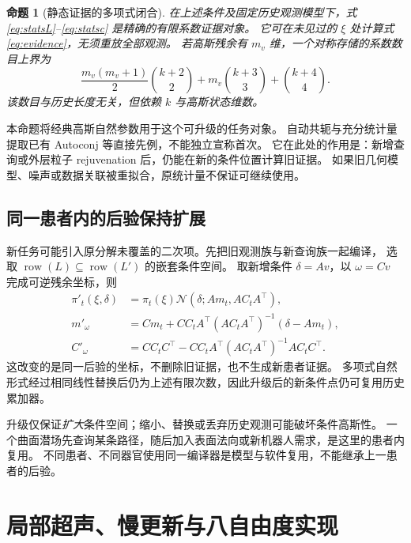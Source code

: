 \documentclass[11pt,a4paper]{article}
\numberwithin{equation}{section}
\newtheorem{proposition}[theorem]{命题}
\theoremstyle{definition}
\newcommand{\N}{\mathcal N}
\DeclareMathOperator{\row}{row}
\begin{document}
\begin{proposition}[静态证据的多项式闭合]
\label{prop:stats}
在上述条件及固定历史观测模型下，式\eqref{eq:statsL}--\eqref{eq:statsc} 是精确的有限系数证据对象。
它可在未见过的 \(\xi\) 处计算式\eqref{eq:evidence}，无须重放全部观测。
若高斯残余有 \(m_v\) 维，一个对称存储的系数数目上界为
\begin{equation}
 \frac{m_v(m_v+1)}2\binom{k+2}{2}
   +m_v\binom{k+3}{3}+\binom{k+4}{4}.
 \label{eq:storage}
\end{equation}
该数目与历史长度无关，但依赖 \(k\) 与高斯状态维数。
\end{proposition}

本命题将经典高斯自然参数用于这个可升级的任务对象。
自动共轭与充分统计量提取已有 Autoconj 等直接先例\cite{autoconj2018}，不能独立宣称首次。
它在此处的作用是：新增查询或外层粒子 rejuvenation 后，仍能在新的条件位置计算旧证据。
如果旧几何模型、噪声或数据关联被重拟合，原统计量不保证可继续使用。

\subsection{同一患者内的后验保持扩展}
新任务可能引入原分解未覆盖的二次项。先把旧观测族与新查询族一起编译，
选取 \(\row(L)\subseteq\row(L')\) 的嵌套条件空间。
取新增条件 \(\delta=A v\)，以 \(\omega=Cv\) 完成可逆残余坐标，则
\begin{align}
 \pi'_t(\xi,\delta)
 &=\pi_t(\xi)\N(\delta;A m_t,A C_t A^\top),\label{eq:upgrade}\\
 m'_\omega&=C m_t+C C_t A^\top(A C_t A^\top)^{-1}(\delta-A m_t),\nonumber\\
 C'_\omega&=C C_t C^\top-C C_tA^\top(A C_t A^\top)^{-1}A C_t C^\top .\nonumber
\end{align}
这改变的是同一后验的坐标，不删除旧证据，也不生成新患者证据。
多项式自然形式经过相同线性替换后仍为上述有限次数，因此升级后的新条件点仍可复用历史累加器。

升级仅保证\emph{扩大}条件空间；缩小、替换或丢弃历史观测可能破坏条件高斯性。
一个曲面潜场先查询某条路径，随后加入表面法向或新机器人需求，是这里的患者内复用。
不同患者、不同器官使用同一编译器是模型与软件复用，不能继承上一患者的后验。

\section{局部超声、慢更新与八自由度实现}
\label{sec:robot}
\end{document}
